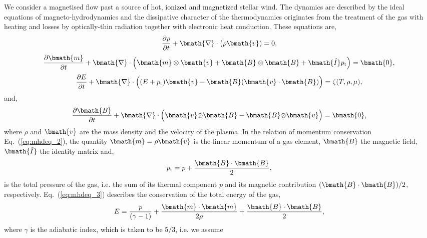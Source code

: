 \documentclass[useAMS,usenatbib]{mn2e}
\begin{document}
We consider a magnetised flow past a source of hot, \textcolor{black}{ionized and magnetized} stellar wind. 
The dynamics are described by the ideal equations of 
magneto-hydrodynamics and the dissipative character of the 
thermodynamics originates from the treatment of the gas with heating and losses 
by optically-thin radiation together with electronic heat conduction. 
These equations are,
%
\begin{equation}
	   \frac{\partial \rho}{\partial t}  + 
	   \bmath{\nabla}  \cdot \big(\rho\bmath{v}) =   0,
\label{eq:mhdeq_1}
\end{equation}
%
\begin{equation}
	   \frac{\partial \bmath{m} }{\partial t}  + 
           \bmath{\nabla} \cdot \Big( \bmath{m} \otimes \bmath{v}  + \bmath{B} \otimes \bmath{B} + \bmath{\hat{I}}p_{\rm t} \Big) 
            =   \bmath{0},
\label{eq:mhdeq_2}
\end{equation}
%
\begin{equation}
	  \frac{\partial E }{\partial t}   + 
	  \bmath{\nabla} \cdot \Big( (E+p_{\rm t})\bmath{v}-\bmath{B}(\bmath{v}\cdot\bmath{B}) \Big)  = \zeta(T,\rho,\mu),
\label{eq:mhdeq_3}
\end{equation}
%
and,
%
\begin{equation}
	  \frac{\partial \bmath{B} }{\partial t}   + 
	  \bmath{\nabla} \cdot \Big( \bmath{v}  \textcolor{black}{\otimes} \bmath{B} - \bmath{B} \textcolor{black}{\otimes} \bmath{v} \Big)  =
	  \bmath{0},
\label{eq:mhdeq_4}
\end{equation}
%
where $\rho$ and $\bmath{v}$ are the mass density and the velocity of the
plasma. In the relation of momentum conservation Eq.~(\ref{eq:mhdeq_2}), the
quantity $\bmath{m}=\rho\bmath{v}$ is the linear momentum of a gas element,
$\bmath{B}$ the magnetic field, $\bmath{\hat{I}}$ the \textcolor{black}{identity matrix} and,  
%
\begin{equation}
	  p_{\rm t}  =	p + \frac{ \bmath{B} \cdot \bmath{B} }{2},
\label{eq:pres}
\end{equation}
%
is the total pressure of the gas, i.e. the sum of its thermal component $p$ 
and its magnetic contribution $(\bmath{B} \cdot \bmath{B})/2$, respectively. 
Eq.~(\ref{eq:mhdeq_3}) describes the conservation of the total energy of the gas, 
%
\begin{equation}
	E = \frac{p}{(\gamma - 1)} + \frac{ \bmath{m} \cdot \bmath{m} }{2\rho} + \frac{ \bmath{B} \cdot \bmath{B} }{2},
\label{eq:energy}
\end{equation}
%
where $\gamma$ is the adiabatic index, \textcolor{black}{which is taken to be $5/3$}, i.e. we assume 
\end{document}
